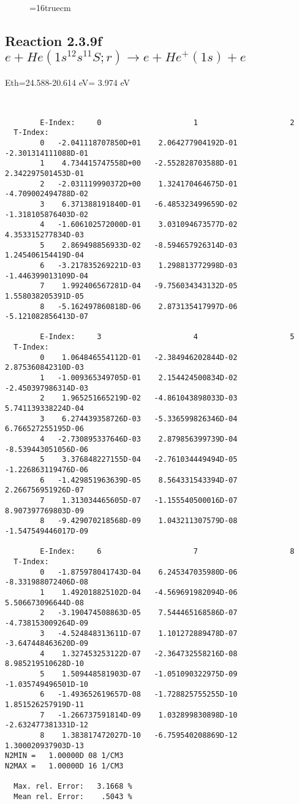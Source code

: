 \documentclass[12pt,dvipdfmx]{article}
\begin{document}
\begin{figure} \label{2.3.9e}
\epsfxsize=16truecm
\end{figure}
\newpage

\subsection{
Reaction 2.3.9f  $e + He(1s^12s^11S;r) \rightarrow e + He^+(1s) + e  $
}
Eth=24.588-20.614 eV= 3.974 eV


\begin{small}\begin{verbatim}


        E-Index:     0                     1                     2
  T-Index:
        0   -2.041118707850D+01    2.064277904192D-01   -2.301314111088D-01
        1    4.734415747558D+00   -2.552828703588D-01    2.342297501453D-01
        2   -2.031119990372D+00    1.324170464675D-01   -4.709002494788D-02
        3    6.371388191840D-01   -6.485323499659D-02   -1.318105876403D-02
        4   -1.606102572000D-01    3.031094673577D-02    4.353315277834D-03
        5    2.869498856933D-02   -8.594657926314D-03    1.245406154419D-04
        6   -3.217835269221D-03    1.298813772998D-03   -1.446399013109D-04
        7    1.992406567281D-04   -9.756034343132D-05    1.558038205391D-05
        8   -5.162497860818D-06    2.873135417997D-06   -5.121082856413D-07

        E-Index:     3                     4                     5
  T-Index:
        0    1.064846554112D-01   -2.384946202844D-02    2.875360842310D-03
        1   -1.009365349705D-01    2.154424500834D-02   -2.450397986314D-03
        2    1.965251665219D-02   -4.861043898033D-03    5.741139338224D-04
        3    6.274439358726D-03   -5.336599826346D-04    6.766527255195D-06
        4   -2.730895337646D-03    2.879856399739D-04   -8.539443051056D-06
        5    3.376848227155D-04   -2.761034449494D-05   -1.226863119476D-06
        6   -1.429851963639D-05    8.564331543394D-07    2.266756951926D-07
        7    1.313034465605D-07   -1.155540500016D-07    8.907397769803D-09
        8   -9.429070218568D-09    1.043211307579D-08   -1.547549446017D-09

        E-Index:     6                     7                     8
  T-Index:
        0   -1.875978041743D-04    6.245347035980D-06   -8.331988072406D-08
        1    1.492018825102D-04   -4.569691982094D-06    5.506673096644D-08
        2   -3.190474508863D-05    7.544465168586D-07   -4.738153009264D-09
        3   -4.524848313611D-07    1.101272889478D-07   -3.647448463620D-09
        4    1.327453253122D-07   -2.364732558216D-08    8.985219510628D-10
        5    1.509448581903D-07   -1.051090322975D-09   -1.035749496501D-10
        6   -1.493652619657D-08   -1.728825755255D-10    1.851526257919D-11
        7   -1.266737591814D-09    1.032899830898D-10   -2.632477381331D-12
        8    1.383817472027D-10   -6.759540208869D-12    1.300020937903D-13
N2MIN =   1.00000D 08 1/CM3
N2MAX =   1.00000D 16 1/CM3

  Max. rel. Error:   3.1668 %
  Mean rel. Error:    .5043 %


\end{verbatim}\end{small}
\end{document}
